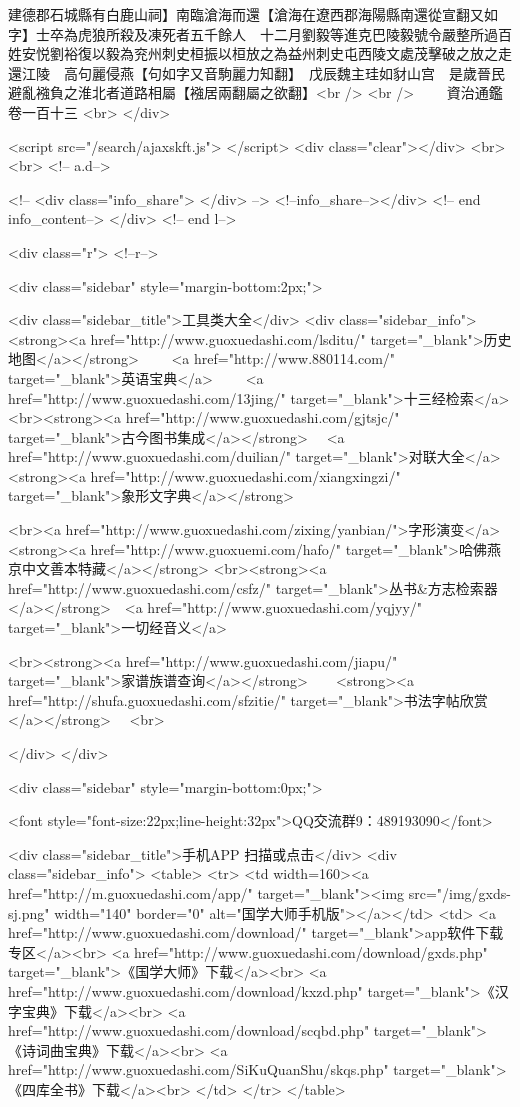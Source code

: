 建德郡石城縣有白鹿山祠】南臨滄海而還【滄海在遼西郡海陽縣南還從宣翻又如字】士卒為虎狼所殺及凍死者五千餘人　十二月劉毅等進克巴陵毅號令嚴整所過百姓安悦劉裕復以毅為兖州刺史桓振以桓放之為益州刺史屯西陵文處茂擊破之放之走還江陵　高句麗侵燕【句如字又音駒麗力知翻】　戊辰魏主珪如豺山宫　是歲晉民避亂襁負之淮北者道路相屬【襁居兩翻屬之欲翻】<br />
<br />
　　資治通鑑卷一百十三  <br>
   </div> 

<script src="/search/ajaxskft.js"> </script>
 <div class="clear"></div>
<br>
<br>
 <!-- a.d-->

 <!--
<div class="info_share">
</div> 
-->
 <!--info_share--></div>   <!-- end info_content-->
  </div> <!-- end l-->

<div class="r">   <!--r-->



<div class="sidebar"  style="margin-bottom:2px;">

 
<div class="sidebar_title">工具类大全</div>
<div class="sidebar_info">
<strong><a href="http://www.guoxuedashi.com/lsditu/" target="_blank">历史地图</a></strong>　　
<a href="http://www.880114.com/" target="_blank">英语宝典</a>　　
<a href="http://www.guoxuedashi.com/13jing/" target="_blank">十三经检索</a>　
<br><strong><a href="http://www.guoxuedashi.com/gjtsjc/" target="_blank">古今图书集成</a></strong>　
<a href="http://www.guoxuedashi.com/duilian/" target="_blank">对联大全</a>　<strong><a href="http://www.guoxuedashi.com/xiangxingzi/" target="_blank">象形文字典</a></strong>　

<br><a href="http://www.guoxuedashi.com/zixing/yanbian/">字形演变</a>　　<strong><a href="http://www.guoxuemi.com/hafo/" target="_blank">哈佛燕京中文善本特藏</a></strong>
<br><strong><a href="http://www.guoxuedashi.com/csfz/" target="_blank">丛书&方志检索器</a></strong>　<a href="http://www.guoxuedashi.com/yqjyy/" target="_blank">一切经音义</a>　　

<br><strong><a href="http://www.guoxuedashi.com/jiapu/" target="_blank">家谱族谱查询</a></strong>　　<strong><a href="http://shufa.guoxuedashi.com/sfzitie/" target="_blank">书法字帖欣赏</a></strong>　
<br>

</div>
</div>


<div class="sidebar" style="margin-bottom:0px;">

<font style="font-size:22px;line-height:32px">QQ交流群9：489193090</font>


<div class="sidebar_title">手机APP 扫描或点击</div>
<div class="sidebar_info">
<table>
<tr>
	<td width=160><a href="http://m.guoxuedashi.com/app/" target="_blank"><img src="/img/gxds-sj.png" width="140"  border="0" alt="国学大师手机版"></a></td>
	<td>
<a href="http://www.guoxuedashi.com/download/" target="_blank">app软件下载专区</a><br>
<a href="http://www.guoxuedashi.com/download/gxds.php" target="_blank">《国学大师》下载</a><br>
<a href="http://www.guoxuedashi.com/download/kxzd.php" target="_blank">《汉字宝典》下载</a><br>
<a href="http://www.guoxuedashi.com/download/scqbd.php" target="_blank">《诗词曲宝典》下载</a><br>
<a href="http://www.guoxuedashi.com/SiKuQuanShu/skqs.php" target="_blank">《四库全书》下载</a><br>
</td>
</tr>
</table>

